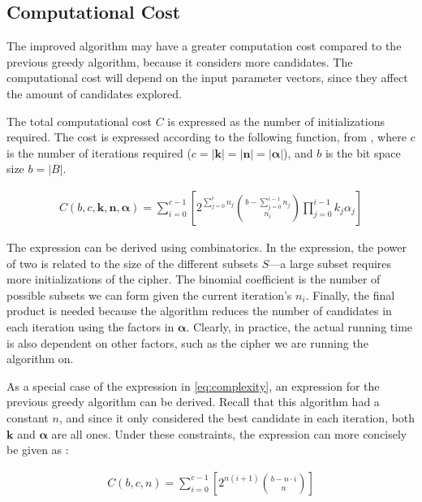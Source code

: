 {\subsection{Computational Cost}
The improved algorithm may have a greater computation cost compared to the previous greedy algorithm, because it considers more candidates. The computational cost will depend on the input parameter vectors, since they affect the amount of candidates explored.

The total computational cost $C$ is expressed as the number of initializations required. The cost is expressed according to the following function, from \cite{karlsson:2017}, where $c$ is the number of iterations required ($c=|\bm{k}|=|\bm{n}|=|\bm{\alpha}|$), and $b$ is the bit space size $b=|B|$.

\begin{align}
C(b, c, \bm{k}, \bm{n}, \bm{\alpha}) = 
\sum_{i=0}^{c-1} \left[ 2^{\sum_{j=0}^{i} n_j} \binom{b - \sum_{j=0}^{i-1} n_j}{n_i} \prod_{j=0}^{i-1} k_j \alpha_j \right]
\label{eq:complexity}
\end{align}

The expression can be derived using combinatorics. In the expression, the power of two is related to the size of the different subsets $S$---a large subset requires more initializations of the cipher. The binomial coefficient is the number of possible subsets we can form given the current iteration's $n_i$. Finally, the final product is needed because the algorithm reduces the number of candidates in each iteration using the factors in $\bm{\alpha}$.
Clearly, in practice, the actual running time is also dependent on other factors, such as the cipher we are running the algorithm on.

As a special case of the expression in \autoref{eq:complexity}, an expression for the previous greedy algorithm can be derived. Recall that this algorithm had a constant $n$, and since it only considered the best candidate in each iteration, both $\bm{k}$ and $\bm{\alpha}$ are all ones. Under these constraints, the expression can more concisely be given as \cite{karlsson:2017}:

\begin{align}
C(b, c, n) = \sum_{i=0}^{c-1} \left[ 2^{n(i+1)} \binom{b - n \cdot i}{n} \right]
\label{eq:complexitygreedy}
\end{align}



}
